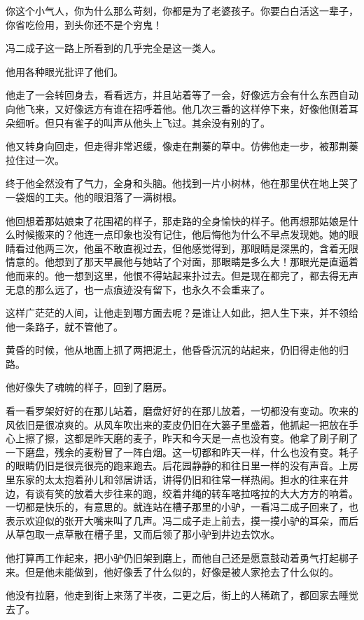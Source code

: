 \par 你这个小气人，你为什么那么苛刻，你都是为了老婆孩子。你要白白活这一辈子，你省吃俭用，到头你还不是个穷鬼！
\par 冯二成子这一路上所看到的几乎完全是这一类人。
\par 他用各种眼光批评了他们。
\par 他走了一会转回身去，看看远方，并且站着等了一会，好像远方会有什么东西自动向他飞来，又好像远方有谁在招呼着他。他几次三番的这样停下来，好像他侧着耳朵细听。但只有雀子的叫声从他头上飞过。其余没有别的了。
\par 他又转身向回走，但走得非常迟缓，像走在荆蓁的草中。仿佛他走一步，被那荆蓁拉住过一次。
\par 终于他全然没有了气力，全身和头脑。他找到一片小树林，他在那里伏在地上哭了一袋烟的工夫。他的眼泪落了一满树根。
\par 他回想着那姑娘束了花围裙的样子，那走路的全身愉快的样子。他再想那姑娘是什么时候搬来的？他连一点印象也没有记住，他后悔他为什么不早点发现她。她的眼睛看过他两三次，他虽不敢直视过去，但他感觉得到，那眼睛是深黑的，含着无限情意的。他想到了那天早晨他与她站了个对面，那眼睛是多么大！那眼光是直逼着他而来的。他一想到这里，他恨不得站起来扑过去。但是现在都完了，都去得无声无息的那么远了，也一点痕迹没有留下，也永久不会重来了。
\par 这样广茫茫的人间，让他走到哪方面去呢？是谁让人如此，把人生下来，并不领给他一条路子，就不管他了。
\par 黄昏的时候，他从地面上抓了两把泥土，他昏昏沉沉的站起来，仍旧得走他的归路。
\par 他好像失了魂魄的样子，回到了磨房。
\par 看一看罗架好好的在那儿站着，磨盘好好的在那儿放着，一切都没有变动。吹来的风依旧是很凉爽的。从风车吹出来的麦皮仍旧在大篓子里盛着，他抓起一把放在手心上擦了擦，这都是昨天磨的麦子，昨天和今天是一点也没有变。他拿了刷子刷了一下磨盘，残余的麦粉冒了一阵白烟。这一切都和昨天一样，什么也没有变。耗子的眼睛仍旧是很亮很亮的跑来跑去。后花园静静的和往日里一样的没有声音。上房里东家的太太抱着孙儿和邻居讲话，讲得仍旧和往常一样热闹。担水的往来在井边，有谈有笑的放着大步往来的跑，绞着井绳的转车喀拉喀拉的大大方方的响着。一切都是快乐的，有意思的。就连站在槽子那里的小驴，一看冯二成子回来了，也表示欢迎似的张开大嘴来叫了几声。冯二成子走上前去，摸一摸小驴的耳朵，而后从草包取一点草散在槽子里，又而后领了那小驴到井边去饮水。
\par 他打算再工作起来，把小驴仍旧架到磨上，而他自己还是愿意鼓动着勇气打起梆子来。但是他未能做到，他好像丢了什么似的，好像是被人家抢去了什么似的。
\par 他没有拉磨，他走到街上来荡了半夜，二更之后，街上的人稀疏了，都回家去睡觉去了。
